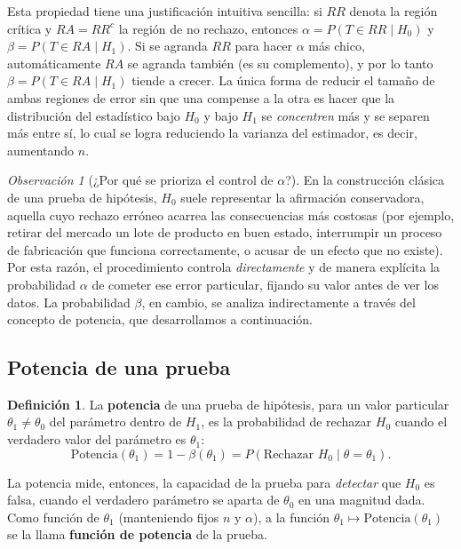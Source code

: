 \documentclass[11pt,a4paper]{article}
\theoremstyle{plain}
\theoremstyle{definition}
\newtheorem{definicion}[teorema]{Definición}
\theoremstyle{remark}
\newtheorem{observacion}[teorema]{Observación}
\begin{document}
Esta propiedad tiene una justificación intuitiva sencilla: si $RR$ denota la región crítica y $RA=RR^c$ la región de no rechazo, entonces $\alpha=P(T\in RR\mid H_0)$ y $\beta=P(T\in RA\mid H_1)$. Si se agranda $RR$ para hacer $\alpha$ más chico, automáticamente $RA$ se agranda también (es su complemento), y por lo tanto $\beta=P(T\in RA\mid H_1)$ tiende a crecer. La única forma de reducir el tamaño de ambas regiones de error sin que una compense a la otra es hacer que la distribución del estadístico bajo $H_0$ y bajo $H_1$ se \emph{concentren} más y se separen más entre sí, lo cual se logra reduciendo la varianza del estimador, es decir, aumentando $n$.

\begin{observacion}[¿Por qué se prioriza el control de $\alpha$?]
En la construcción clásica de una prueba de hipótesis, $H_0$ suele representar la afirmación conservadora, aquella cuyo rechazo erróneo acarrea las consecuencias más costosas (por ejemplo, retirar del mercado un lote de producto en buen estado, interrumpir un proceso de fabricación que funciona correctamente, o acusar de un efecto que no existe). Por esta razón, el procedimiento controla \emph{directamente} y de manera explícita la probabilidad $\alpha$ de cometer ese error particular, fijando su valor antes de ver los datos. La probabilidad $\beta$, en cambio, se analiza indirectamente a través del concepto de potencia, que desarrollamos a continuación.
\end{observacion}

\subsection{Potencia de una prueba}

\begin{definicion}
La \textbf{potencia} de una prueba de hipótesis, para un valor particular $\theta_1\neq\theta_0$ del parámetro dentro de $H_1$, es la probabilidad de rechazar $H_0$ cuando el verdadero valor del parámetro es $\theta_1$:
\[
\text{Potencia}(\theta_1) = 1-\beta(\theta_1) = P(\text{Rechazar } H_0 \mid \theta=\theta_1).
\]
\end{definicion}

La potencia mide, entonces, la capacidad de la prueba para \emph{detectar} que $H_0$ es falsa, cuando el verdadero parámetro se aparta de $\theta_0$ en una magnitud dada. Como función de $\theta_1$ (manteniendo fijos $n$ y $\alpha$), a la función $\theta_1\mapsto \text{Potencia}(\theta_1)$ se la llama \textbf{función de potencia} de la prueba.
\end{document}
